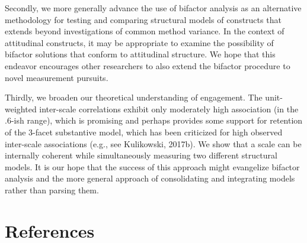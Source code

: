 \documentclass[
  english,
  man]{apa7}
\begin{document}
Secondly, we more generally advance the use of bifactor analysis as an alternative methodology for testing and comparing structural models of constructs that extends beyond investigations of common method variance. In the context of attitudinal constructs, it may be appropriate to examine the possibility of bifactor solutions that conform to attitudinal structure. We hope that this endeavor encourages other researchers to also extend the bifactor procedure to novel measurement pursuits.

Thirdly, we broaden our theoretical understanding of engagement. The unit-weighted inter-scale correlations exhibit only moderately high association (in the .6-ish range), which is promising and perhaps provides some support for retention of the 3-facet substantive model, which has been criticized for high observed inter-scale associations (e.g., see Kulikowski, 2017b). We show that a scale can be internally coherent while simultaneously measuring two different structural models. It is our hope that the success of this approach might evangelize bifactor analysis and the more general approach of consolidating and integrating models rather than parsing them.

\newpage

\hypertarget{references}{%
\section{References}\label{references}}

\begingroup
\setlength{\parindent}{-0.5in}
\setlength{\leftskip}{0.5in}
\end{document}
